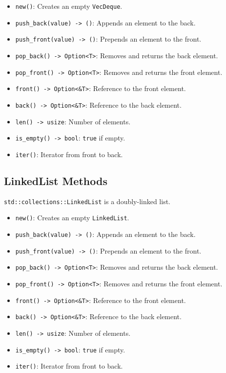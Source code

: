 \documentclass[
  11pt,
]{article}
\providecommand{\tightlist}{%
  \setlength{\itemsep}{0pt}\setlength{\parskip}{0pt}}
\begin{document}
\begin{itemize}
\tightlist
\item
  \texttt{new()}: Creates an empty \texttt{VecDeque}.
\item
  \texttt{push\_back(value)\ -\textgreater{}\ ()}: Appends an element to
  the back.
\item
  \texttt{push\_front(value)\ -\textgreater{}\ ()}: Prepends an element
  to the front.
\item
  \texttt{pop\_back()\ -\textgreater{}\ Option\textless{}T\textgreater{}}:
  Removes and returns the back element.
\item
  \texttt{pop\_front()\ -\textgreater{}\ Option\textless{}T\textgreater{}}:
  Removes and returns the front element.
\item
  \texttt{front()\ -\textgreater{}\ Option\textless{}\&T\textgreater{}}:
  Reference to the front element.
\item
  \texttt{back()\ -\textgreater{}\ Option\textless{}\&T\textgreater{}}:
  Reference to the back element.
\item
  \texttt{len()\ -\textgreater{}\ usize}: Number of elements.
\item
  \texttt{is\_empty()\ -\textgreater{}\ bool}: \texttt{true} if empty.
\item
  \texttt{iter()}: Iterator from front to back.
\end{itemize}

\subsection{LinkedList Methods}\label{linkedlist-methods}

\texttt{std::collections::LinkedList} is a doubly-linked list.

\begin{itemize}
\tightlist
\item
  \texttt{new()}: Creates an empty \texttt{LinkedList}.
\item
  \texttt{push\_back(value)\ -\textgreater{}\ ()}: Appends an element to
  the back.
\item
  \texttt{push\_front(value)\ -\textgreater{}\ ()}: Prepends an element
  to the front.
\item
  \texttt{pop\_back()\ -\textgreater{}\ Option\textless{}T\textgreater{}}:
  Removes and returns the back element.
\item
  \texttt{pop\_front()\ -\textgreater{}\ Option\textless{}T\textgreater{}}:
  Removes and returns the front element.
\item
  \texttt{front()\ -\textgreater{}\ Option\textless{}\&T\textgreater{}}:
  Reference to the front element.
\item
  \texttt{back()\ -\textgreater{}\ Option\textless{}\&T\textgreater{}}:
  Reference to the back element.
\item
  \texttt{len()\ -\textgreater{}\ usize}: Number of elements.
\item
  \texttt{is\_empty()\ -\textgreater{}\ bool}: \texttt{true} if empty.
\item
  \texttt{iter()}: Iterator from front to back.
\end{itemize}
\end{document}
